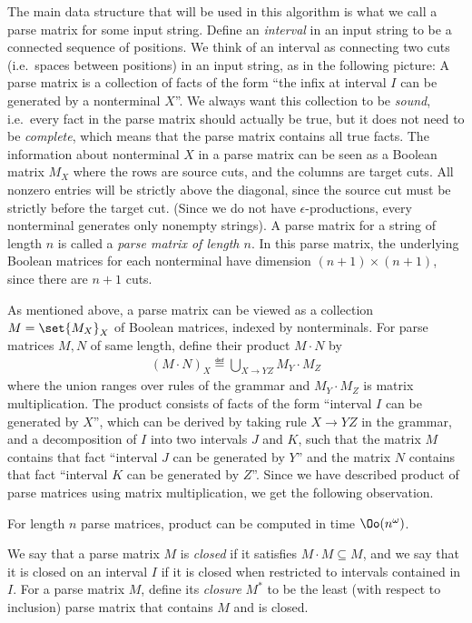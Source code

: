 The main data structure that will be used in this algorithm is what we call a parse matrix for some input string. Define an \emph{interval} in an input string to be a connected sequence of positions. We think of an interval as connecting two cuts (i.e.~spaces between positions) in an input string, as in the following picture:
A parse matrix is a collection of facts of the form  ``the infix at interval $I$  can be generated by a nonterminal $X$''. We always want this collection to be \emph{sound}, i.e.~every fact in the parse matrix should actually be true, but it does not need to be \emph{complete}, which means that the parse matrix contains all true facts. The information about nonterminal $X$ in a parse matrix can be seen as a Boolean matrix $M_X$ where the rows are source cuts, and the columns are target cuts. All nonzero entries will be strictly above the diagonal, since the source cut must be strictly before the target cut. (Since we do not have $\epsilon$-productions, every nonterminal generates only nonempty strings). A parse matrix for a string of length $n$ is called a \emph{parse matrix of length $n$}. In this parse matrix, the underlying Boolean matrices for each nonterminal have dimension $(n+1) \times (n+1)$, since there are $n+1$ cuts.  


As mentioned above, a parse matrix can be viewed as a collection $M = \set{M_X}_X$ of Boolean matrices, indexed by nonterminals. 
For parse matrices $M,N$ of same length, define their product $M \cdot N$ by
\begin{align*}
(M \cdot N)_X \eqdef \bigcup_{X \to YZ} M_Y \cdot M_Z
\end{align*}
where the union ranges over rules of the grammar and $M_Y \cdot M_Z$ is matrix multiplication. The product consists of facts of the form ``interval $I$ can be generated by $X$'', which can be derived by taking rule $X \to YZ$ in the grammar, and a decomposition of $I$ into two intervals $J$ and $K$, such that the matrix $M$ contains that fact ``interval $J$ can be generated by $Y$'' and the matrix $N$ contains that fact ``interval $K$ can be generated by $Z$''. Since we have described product of parse matrices using matrix multiplication, we get the following observation.

\begin{lemma}\label{lem:matrix-mult}
	For length $n$ parse matrices, product can be computed in time $\Oo(n^\omega)$.
\end{lemma}
We say that a parse matrix $M$ is \emph{closed} if it satisfies $M \cdot M \subseteq M$, and we say that it is closed  on an interval $I$ if it is closed when restricted to intervals contained in $I$.  For a parse matrix $M$, define its \emph{closure} $M^*$ to be the least (with respect to inclusion) parse matrix that contains $M$ and is closed.


